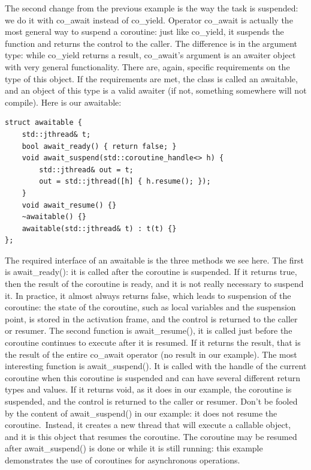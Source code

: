 The second change from the previous example is the way the task is suspended: we do it with co\_await instead of co\_yield. Operator co\_await is actually the most general way to suspend a coroutine: just like co\_yield, it suspends the function and returns the control to the caller. The difference is in the argument type: while co\_yield returns a result, co\_await's argument is an awaiter object with very general functionality. There are, again, specific requirements on the type of this object. If the requirements are met, the class is called an awaitable, and an object of this type is a valid awaiter (if not, something somewhere will not compile). Here is our awaitable:

\begin{lstlisting}[style=styleCXX]
struct awaitable {
	std::jthread& t;
	bool await_ready() { return false; }
	void await_suspend(std::coroutine_handle<> h) {
		std::jthread& out = t;
		out = std::jthread([h] { h.resume(); });
	}
	void await_resume() {}
	~awaitable() {}
	awaitable(std::jthread& t) : t(t) {}
};
\end{lstlisting}

The required interface of an awaitable is the three methods we see here. The first is await\_ready(): it is called after the coroutine is suspended. If it returns true, then the result of the coroutine is ready, and it is not really necessary to suspend it. In practice, it almost always returns false, which leads to suspension of the coroutine: the state of the coroutine, such as local variables and the suspension point, is stored in the activation frame, and the control is returned to the caller or resumer. The second function is await\_resume(), it is called just before the coroutine continues to execute after it is resumed. If it returns the result, that is the result of the entire co\_await operator (no result in our example). The most interesting function is await\_suspend(). It is called with the handle of the current coroutine when this coroutine is suspended and can have several different return types and values. If it returns void, as it does in our example, the coroutine is suspended, and the control is returned to the caller or resumer. Don't be fooled by the content of await\_suspend() in our example: it does not resume the coroutine. Instead, it creates a new thread that will execute a callable object, and it is this object that resumes the coroutine. The coroutine may be resumed after await\_suspend() is done or while it is still running: this example demonstrates the use of coroutines for asynchronous operations. 

